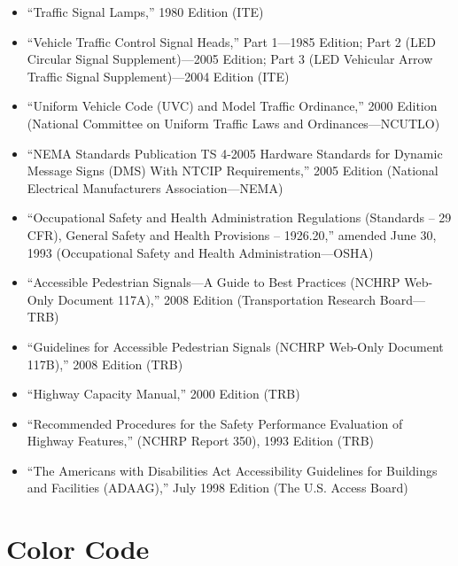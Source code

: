 \documentclass[9pt]{memoir}
\begin{document}
{\begin{itemize}
\item ``Traffic Signal Lamps,'' 1980 Edition (ITE)
\item ``Vehicle Traffic Control Signal Heads,'' Part 1---1985 Edition; Part 2 (LED Circular Signal Supplement)---2005 Edition; Part 3 (LED Vehicular Arrow Traffic Signal Supplement)---2004 Edition (ITE)
\item ``Uniform Vehicle Code (UVC) and Model Traffic Ordinance,'' 2000 Edition (National Committee on Uniform Traffic Laws and Ordinances---NCUTLO)
\item ``NEMA Standards Publication TS 4-2005 Hardware Standards for Dynamic Message Signs (DMS) With NTCIP Requirements,'' 2005 Edition (National Electrical Manufacturers Association---NEMA)
\item ``Occupational Safety and Health Administration Regulations (Standards -- 29 CFR), General Safety and Health Provisions -- 1926.20,'' amended June 30, 1993 (Occupational Safety and Health Administration---OSHA)
\item ``Accessible Pedestrian Signals---A Guide to Best Practices (NCHRP Web-Only Document 117A),'' 2008 Edition (Transportation Research Board---TRB)
\item ``Guidelines for Accessible Pedestrian Signals (NCHRP Web-Only Document 117B),'' 2008 Edition (TRB)
\item ``Highway Capacity Manual,'' 2000 Edition (TRB)
\item ``Recommended Procedures for the Safety Performance Evaluation of Highway Features,'' (NCHRP Report 350), 1993 Edition (TRB)
\item ``The Americans with Disabilities Act Accessibility Guidelines for Buildings and Facilities (ADAAG),'' July 1998 Edition (The U.S. Access Board)
\end{itemize}}

\section{Color Code}

\end{document}
